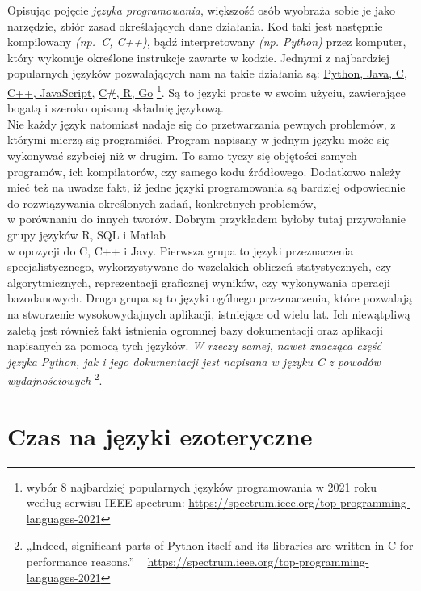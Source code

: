 \documentclass[fleqn,10pt]{SelfArx} %
\begin{document}
	Opisując pojęcie \textit{języka programowania}, większość osób wyobraża sobie je jako narzędzie,
	zbiór zasad określających dane działania. Kod taki jest następnie kompilowany \textit{(np.~C, C++)}, 
	bądź interpretowany \textit{(np. Python)} przez komputer, który wykonuje określone instrukcje zawarte w kodzie.
	Jednymi z najbardziej popularnych języków pozwalających nam na takie działania są: \underline{Python, Java, C, C++, JavaScript,} \underline{C\#, R, Go} 
	\cite{IEEESpectrum:popularLang2021}\footnote{wybór 8 najbardziej popularnych języków programowania w 2021 roku według serwisu IEEE spectrum:
		\url{https://spectrum.ieee.org/top-programming-languages-2021}}.
	Są to języki proste w swoim użyciu, zawierające bogatą i szeroko opisaną składnię językową.\\
	Nie każdy język natomiast nadaje się do przetwarzania pewnych problemów, z którymi mierzą się programiści. 
	Program napisany w jednym języku może się wykonywać szybciej niż w drugim. To samo tyczy się objętości samych programów, 
	ich kompilatorów, czy samego kodu źródłowego. Dodatkowo należy mieć też na uwadze fakt, 
	iż jedne języki programowania są bardziej odpowiednie do rozwiązywania określonych zadań, konkretnych problemów,\\
	w porównaniu do innych tworów.
	\indent Dobrym przykładem byłoby tutaj przywołanie grupy języków R, SQL i Matlab\\w opozycji do C, C++ i Javy. 
	Pierwsza grupa to języki przeznaczenia specjalistycznego, wykorzystywane do wszelakich obliczeń statystycznych, 
	czy algorytmicznych, reprezentacji graficznej wyników, czy wykonywania operacji bazodanowych. 
	Druga grupa są to języki ogólnego przeznaczenia, które pozwalają na stworzenie wysokowydajnych aplikacji, istniejące od wielu lat. 
	Ich niewątpliwą zaletą jest również fakt istnienia ogromnej bazy dokumentacji oraz aplikacji napisanych za pomocą tych języków. 
	\textit{W rzeczy samej, nawet znacząca część języka Python, jak i jego dokumentacji jest napisana w języku C z powodów wydajnościowych}
	\cite{IEEESpectrum:popularLang2021}\footnote{„Indeed, significant parts of Python itself and its libraries are written in C for performance reasons.” ~ \url{https://spectrum.ieee.org/top-programming-languages-2021}}.


\section{Czas na języki ezoteryczne}
\end{document}
